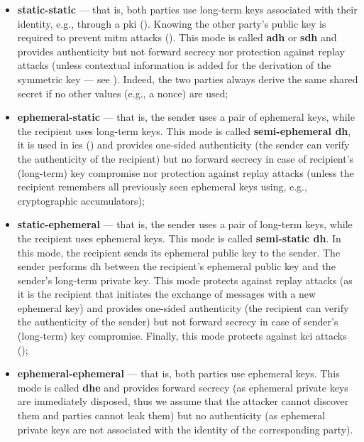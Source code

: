 \begin{itemize}
	\item \textbf{static-static} --- that is, both parties use long-term keys associated with their identity, e.g., through a \gls{pki} (). Knowing the other party's public key is required to prevent \gls{mitm} attacks (). This mode is called \textbf{\gls{adh}} or \textbf{\gls{sdh}} and provides authenticity but not forward secrecy nor protection against replay attacks (unless contextual information is added for the derivation of the symmetric key --- see ). Indeed, the two parties always derive the same shared secret if no other values (e.g., a nonce) are used;
	\item \textbf{ephemeral-static} --- that is, the sender uses a pair of ephemeral keys, while the recipient uses long-term keys. This mode is called \textbf{semi-ephemeral \gls{dh}}, it is used in \gls{ies} () and provides one-sided authenticity (the sender can verify the authenticity of the recipient) but no forward secrecy in case of recipient's (long-term) key compromise nor protection against replay attacks (unless the recipient remembers all previously seen ephemeral keys using, e.g., cryptographic accumulators);
	\item \textbf{static-ephemeral} --- that is, the sender uses a pair of long-term keys, while the recipient uses ephemeral keys. This mode is called \textbf{semi-static \gls{dh}}. In this mode, the recipient sends its ephemeral public key to the sender. The sender performs \gls{dh} between the recipient's ephemeral public key and the sender's long-term private key. This mode protects against replay attacks (as it is the recipient that initiates the exchange of messages with a new ephemeral key) and provides one-sided authenticity (the recipient can verify the authenticity of the sender) but not forward secrecy in case of sender's (long-term) key compromise. Finally, this mode protects against \gls{kci} attacks ();
	\item \textbf{ephemeral-ephemeral} --- that is, both parties use ephemeral keys. This mode is called \textbf{\gls{dhe}} and provides forward secrecy (as ephemeral private keys are immediately disposed, thus we assume that the attacker cannot discover them and parties cannot leak them) but no authenticity (as ephemeral private keys are not associated with the identity of the corresponding party).
\end{itemize}

